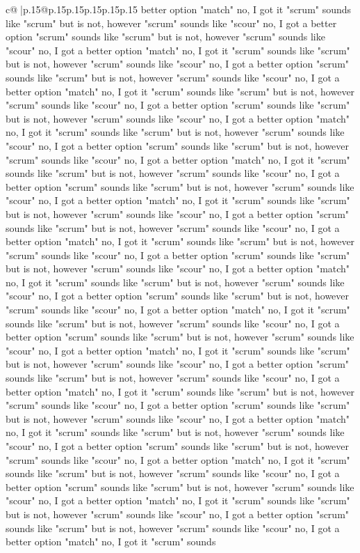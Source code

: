 \documentclass{article}
\begin{document}
{\begin{supertabular}{c@{$\;$}|p{.15\linewidth}@{}p{.15\linewidth}p{.15\linewidth}p{.15\linewidth}p{.15\linewidth}p{.15\linewidth}}
{{{better option "match" no, I got it "scrum" sounds like "scrum" but is not, however "scrum" sounds like "scour" no, I got a better option "scrum" sounds like "scrum" but is not, however "scrum" sounds like "scour" no, I got a better option "match" no, I got it "scrum" sounds like "scrum" but is not, however "scrum" sounds like "scour" no, I got a better option "scrum" sounds like "scrum" but is not, however "scrum" sounds like "scour" no, I got a better option "match" no, I got it "scrum" sounds like "scrum" but is not, however "scrum" sounds like "scour" no, I got a better option "scrum" sounds like "scrum" but is not, however "scrum" sounds like "scour" no, I got a better option "match" no, I got it "scrum" sounds like "scrum" but is not, however "scrum" sounds like "scour" no, I got a better option "scrum" sounds like "scrum" but is not, however "scrum" sounds like "scour" no, I got a better option "match" no, I got it "scrum" sounds like "scrum" but is not, however "scrum" sounds like "scour" no, I got a better option "scrum" sounds like "scrum" but is not, however "scrum" sounds like "scour" no, I got a better option "match" no, I got it "scrum" sounds like "scrum" but is not, however "scrum" sounds like "scour" no, I got a better option "scrum" sounds like "scrum" but is not, however "scrum" sounds like "scour" no, I got a better option "match" no, I got it "scrum" sounds like "scrum" but is not, however "scrum" sounds like "scour" no, I got a better option "scrum" sounds like "scrum" but is not, however "scrum" sounds like "scour" no, I got a better option "match" no, I got it "scrum" sounds like "scrum" but is not, however "scrum" sounds like "scour" no, I got a better option "scrum" sounds like "scrum" but is not, however "scrum" sounds like "scour" no, I got a better option "match" no, I got it "scrum" sounds like "scrum" but is not, however "scrum" sounds like "scour" no, I got a better option "scrum" sounds like "scrum" but is not, however "scrum" sounds like "scour" no, I got a better option "match" no, I got it "scrum" sounds like "scrum" but is not, however "scrum" sounds like "scour" no, I got a better option "scrum" sounds like "scrum" but is not, however "scrum" sounds like "scour" no, I got a better option "match" no, I got it "scrum" sounds like "scrum" but is not, however "scrum" sounds like "scour" no, I got a better option "scrum" sounds like "scrum" but is not, however "scrum" sounds like "scour" no, I got a better option "match" no, I got it "scrum" sounds like "scrum" but is not, however "scrum" sounds like "scour" no, I got a better option "scrum" sounds like "scrum" but is not, however "scrum" sounds like "scour" no, I got a better option "match" no, I got it "scrum" sounds like "scrum" but is not, however "scrum" sounds like "scour" no, I got a better option "scrum" sounds like "scrum" but is not, however "scrum" sounds like "scour" no, I got a better option "match" no, I got it "scrum" sounds like "scrum" but is not, however "scrum" sounds like "scour" no, I got a better option "scrum" sounds like "scrum" but is not, however "scrum" sounds like "scour" no, I got a better option "match" no, I got it "scrum" sounds }}}
\end{supertabular}}
\end{document}
